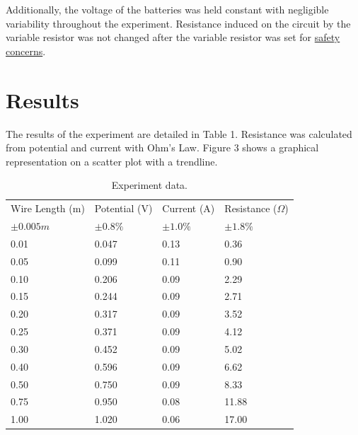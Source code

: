 \documentclass{article}
\begin{document}
Additionally, the voltage of the batteries was held constant with negligible variability throughout the experiment. Resistance induced on the circuit by the variable resistor was not changed after the variable resistor was set for \hyperref[sec:safe]{safety concerns}.

\section{Results}

The results of the experiment are detailed in Table 1. Resistance was calculated from potential and current with Ohm's Law. Figure 3 shows a graphical representation on a scatter plot with a trendline.

\begin{table}[]
\centering
\begin{tabular}{|l|l|l|l|}
\hline
Wire Length (m) & Potential (V) & Current (A) & Resistance ($\Omega$)  \\
$\pm0.005m$    & $\pm0.8\%$    & $\pm1.0\%$ & $\pm1.8\%$ \\
\hline
0.01           & 0.047         & 0.13        & 0.36      \\
0.05           & 0.099         & 0.11        & 0.90      \\
0.10           & 0.206         & 0.09        & 2.29      \\
0.15           & 0.244         & 0.09        & 2.71      \\
0.20           & 0.317         & 0.09        & 3.52      \\
0.25           & 0.371         & 0.09        & 4.12      \\
0.30           & 0.452         & 0.09        & 5.02      \\
0.40           & 0.596         & 0.09        & 6.62      \\
0.50           & 0.750         & 0.09        & 8.33      \\
0.75           & 0.950         & 0.08        & 11.88     \\
1.00           & 1.020         & 0.06        & 17.00     \\
\hline
\end{tabular}
\caption{\label{tab:results}Experiment data.}
\end{table}
\end{document}
